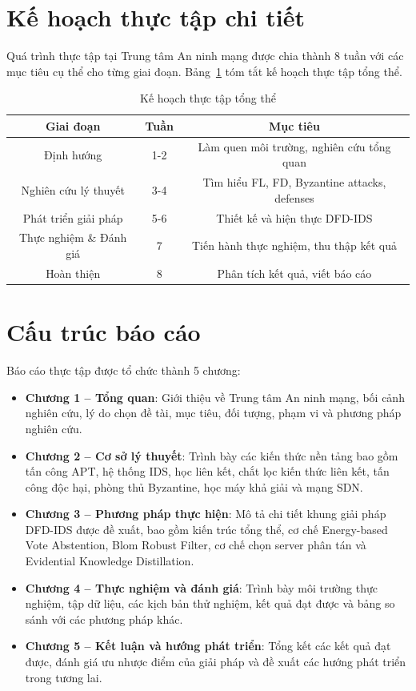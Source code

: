 \section{Kế hoạch thực tập chi tiết}
\label{sec:plan}

Quá trình thực tập tại Trung tâm An ninh mạng được chia thành 8 tuần với các mục tiêu cụ thể cho từng giai đoạn. Bảng~\ref{tab:plan_summary} tóm tắt kế hoạch thực tập tổng thể.

\begin{table}[H]
\centering
\caption{Kế hoạch thực tập tổng thể}
\label{tab:plan_summary}
\begin{tabular}{|c|c|c|}
\hline
\textbf{Giai đoạn} & \textbf{Tuần} & \textbf{Mục tiêu} \\
\hline
Định hướng & 1-2 & Làm quen môi trường, nghiên cứu tổng quan \\
\hline
Nghiên cứu lý thuyết & 3-4 & Tìm hiểu FL, FD, Byzantine attacks, defenses \\
\hline
Phát triển giải pháp & 5-6 & Thiết kế và hiện thực DFD-IDS \\
\hline
Thực nghiệm \& Đánh giá & 7 & Tiến hành thực nghiệm, thu thập kết quả \\
\hline
Hoàn thiện & 8 & Phân tích kết quả, viết báo cáo \\
\hline
\end{tabular}
\end{table}

\section{Cấu trúc báo cáo}
\label{sec:structure}

Báo cáo thực tập được tổ chức thành 5 chương:

\begin{itemize}
    \item \textbf{Chương 1 -- Tổng quan}: Giới thiệu về Trung tâm An ninh mạng, bối cảnh nghiên cứu, lý do chọn đề tài, mục tiêu, đối tượng, phạm vi và phương pháp nghiên cứu.
    \item \textbf{Chương 2 -- Cơ sở lý thuyết}: Trình bày các kiến thức nền tảng bao gồm tấn công APT, hệ thống IDS, học liên kết, chắt lọc kiến thức liên kết, tấn công độc hại, phòng thủ Byzantine, học máy khả giải và mạng SDN.
    \item \textbf{Chương 3 -- Phương pháp thực hiện}: Mô tả chi tiết khung giải pháp DFD-IDS được đề xuất, bao gồm kiến trúc tổng thể, cơ chế Energy-based Vote Abstention, Blom Robust Filter, cơ chế chọn server phân tán và Evidential Knowledge Distillation.
    \item \textbf{Chương 4 -- Thực nghiệm và đánh giá}: Trình bày môi trường thực nghiệm, tập dữ liệu, các kịch bản thử nghiệm, kết quả đạt được và bảng so sánh với các phương pháp khác.
    \item \textbf{Chương 5 -- Kết luận và hướng phát triển}: Tổng kết các kết quả đạt được, đánh giá ưu nhược điểm của giải pháp và đề xuất các hướng phát triển trong tương lai.
\end{itemize}

